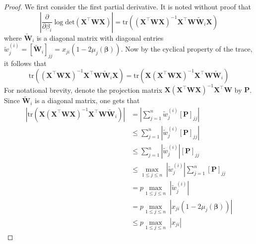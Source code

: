 \documentclass[11pt, a4paper]{article}
\newcommand*{\bb}{\boldsymbol}
\theoremstyle{example} \newtheorem{example}{Example}[section]
\theoremstyle{theorem} \newtheorem{theorem}{Theorem}[section]
\theoremstyle{theorem }\newtheorem{proposition}{Proposition}[section]
\theoremstyle{theorem }\newtheorem{corollary}{Corollary}[section]
\def\\bbeta{\bb{\\bbeta}}
\begin{document}
\begin{proof}
We first consider the first partial derivative. It is noted without proof that 
\begin{equation}
\label{eq:jeffrey_deriv_proof}
\left|\frac{\partial }{\partial \beta_i}\log \textrm{det}(\bb X^\top\bb W\bb X)\right|  = \text{tr}\left( (\bb X^\top\bb W\bb X)^{-1}\bb X^\top\bb W\widetilde{\bb W}_i\bb X \right)
\end{equation}
where $\widetilde{\bb W}_i$ is a diagonal matrix with diagonal entries $\widetilde{w}^{(i)}_{j}=[\widetilde{\bb W}_i]_{jj}   = x_{ji}(1-2\mu_j(\bb\beta))$. 
Now by the cyclical property of the trace, it follows that 
\begin{equation}
\text{tr}\left( (\bb X^\top\bb W\bb X)^{-1}\bb X^\top\bb W\widetilde{\bb W}_i\bb X \right) =\text{tr}\left( \bb X(\bb X^\top\bb W\bb X)^{-1}\bb X^\top\bb W\widetilde{\bb W}_i \right)
\end{equation}
For notational brevity, denote the projection matrix $\bb X(\bb X^\top\bb W\bb X)^{-1}\bb X^\top\bb W$ by $\bb P$. Since $\widetilde{\bb W}_i$ is a diagonal matrix, one gets that 
\begin{align} \label{eq:jeffrey_first_line}
\left| \text{tr}\left( \bb X(\bb X^\top\bb W\bb X)^{-1}\bb X^\top\bb W\widetilde{\bb W}_i \right) \right| &=  \left| \sum_{j=1}^{n}\widetilde{w}_j^{(i)}[\bb P]_{jj} \right| \\ 
&\leq \sum_{j=1}^{n}\left|\widetilde{w}_j^{(i)}[\bb P]_{jj} \right| \\ 
&\leq \sum_{j=1}^{n}\left|\widetilde{w}_j^{(i)}\right|[\bb P]_{jj}  \\ 
&\leq \underset{1\leq j \leq n}{\max}\; \left|\widetilde{w}_j^{(i)}\right| \sum_{j=1}^{n}[\bb P]_{jj}  \\ 
&=p \underset{1\leq j \leq n}{\max}\; \left|\widetilde{w}_j^{(i)}\right|\\ 
&=p \underset{1\leq j \leq n}{\max}\; \left|x_{ji}(1-2\mu_j(\bb\beta))\right| \\ 
&\leq p\underset{1\leq j \leq n}{\max}\;\left|x_{ji}\right|  \label{eq:jeffrey_last_line}
\end{align}

\end{proof}
\end{document}
